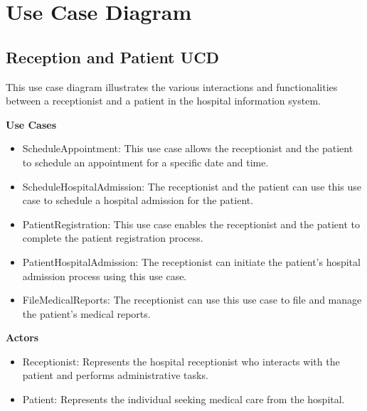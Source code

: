 \section{Use Case Diagram}

\subsection{Reception and Patient UCD}
This use case diagram illustrates the various interactions and functionalities between a receptionist and a patient in the hospital information system.

\textbf{Use Cases}
\begin{itemize}
    \item ScheduleAppointment: This use case allows the receptionist and the patient to schedule an appointment for a specific date and time.
    \item ScheduleHospitalAdmission: The receptionist and the patient can use this use case to schedule a hospital admission for the patient.
    \item PatientRegistration: This use case enables the receptionist and the patient to complete the patient registration process.
    \item PatientHospitalAdmission: The receptionist can initiate the patient's hospital admission process using this use case.
    \item FileMedicalReports: The receptionist can use this use case to file and manage the patient's medical reports.
\end{itemize}

\textbf{Actors}
\begin{itemize}
    \item Receptionist: Represents the hospital receptionist who interacts with the patient and performs administrative tasks.
    \item Patient: Represents the individual seeking medical care from the hospital.
\end{itemize}

